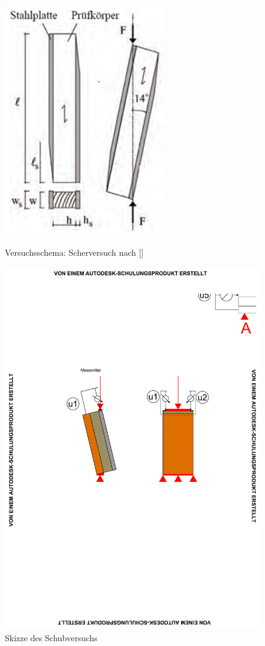 \documentclass[12 pt,a4 paper ]{scrreprt}
\begin{document}
\begin{figure}[h!]
\begin{minipage}[hbt]{7cm}
	\includegraphics[width=7cm]{Auswertung/1versuch/versuchsschema_scherversuch.png}
	\caption{Versuchsschema: Scherversuch nach []}
	\label{versuchsschema_scherversuch}
\end{minipage}
\hfill
\begin{minipage}[hbt]{7cm}
\includegraphics[scale=1.2, trim=4cm 12cm 11.5cm 9cm, clip=true]{Auswertung/schubversuch/Schubversuch_Skizze.pdf}
	\caption{Skizze des Schubversuchs}
	\label{abb:Skizze des Schubversuchs}
\end{minipage}
\end{figure}
\end{document}
